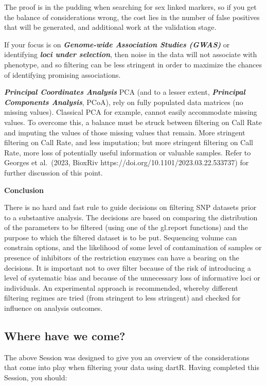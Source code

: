 \documentclass[
  letterpaper,
  DIV=11,
  numbers=noendperiod]{scrreprt}
\begin{document}
The proof is in the pudding when searching for sex linked markers, so if
you get the balance of considerations wrong, the cost lies in the number
of false positives that will be generated, and additional work at the
validation stage.

If your focus is on \textbf{\emph{Genome-wide Association Studies
(GWAS)}} or identifying \textbf{\emph{loci under selection}}, then noise
in the data will not associate with phenotype, and so filtering can be
less stringent in order to maximize the chances of identifying promising
associations.

\textbf{\emph{Principal Coordinates Analysis}} PCA (and to a lesser
extent, \textbf{\emph{Principal Components Analysis}}, PCoA), rely on
fully populated data matrices (no missing values). Classical PCA for
example, cannot easily accommodate missing values. To overcome this, a
balance must be struck between filtering on Call Rate and imputing the
values of those missing values that remain. More stringent filtering on
Call Rate, and less imputation; but more stringent filtering on Call
Rate, more loss of potentially useful information or valuable samples.
Refer to Georges et al.~(2023, BioxRiv
https://doi.org/10.1101/2023.03.22.533737) for further discussion of
this point.

\textbf{Conclusion}

There is no hard and fast rule to guide decisions on filtering SNP
datasets prior to a substantive analysis. The decisions are based on
comparing the distribution of the parameters to be filtered (using one
of the gl.report functions) and the purpose to which the filtered
dataset is to be put. Sequencing volume can constrain options, and the
likelihood of some level of contamination of samples or presence of
inhibitors of the restriction enzymes can have a bearing on the
decisions. It is important not to over filter because of the risk of
introducing a level of systematic bias and because of the unnecessary
loss of informative loci or individuals. An experimental approach is
recommended, whereby different filtering regimes are tried (from
stringent to less stringent) and checked for influence on analysis
outcomes.

\hypertarget{where-have-we-come-1}{%
\subsection{Where have we come?}\label{where-have-we-come-1}}

The above Session was designed to give you an overview of the
considerations that come into play when filtering your data using dartR.
Having completed this Session, you should:
\end{document}
